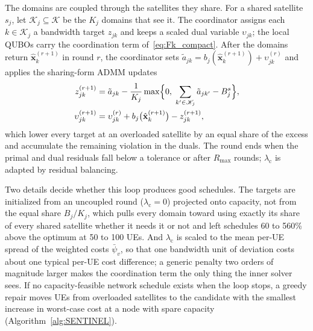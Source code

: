 The domains are coupled through the satellites they share. For a shared satellite $s_j$, let
$\mathscr{K}_j\subseteq\mathscr{K}$ be the $K_j$ domains that see it. The coordinator assigns each
$k\in\mathscr{K}_j$ a bandwidth target $z_{jk}$ and keeps a scaled dual variable $\upsilon_{jk}$; the local QUBOs carry the
coordination term of~\eqref{eq:Fk_compact}. After the domains return $\hat{\mathbf{x}}_k^{(r+1)}$ in round $r$, the
coordinator sets $\tilde{a}_{jk}=b_j(\hat{\mathbf{x}}_{k}^{(r+1)})+\upsilon_{jk}^{(r)}$ and applies the sharing-form ADMM
updates~\cite{Boyd2011}
\begin{align}
    z_{jk}^{(r+1)}&=\tilde{a}_{jk}-\frac{1}{K_j}\max\Bigl\{0,\;\sum_{k'\in\mathscr{K}_j}\tilde{a}_{jk'}-B^{s}_{j}\Bigr\},
    \label{eq:z_update}\\
    \upsilon_{jk}^{(r+1)}&=\upsilon_{jk}^{(r)}+b_j\bigl(\hat{\mathbf{x}}_{k}^{(r+1)}\bigr)-z_{jk}^{(r+1)},
    \label{eq:u_update}
\end{align}
which lower every target at an overloaded satellite by an equal share of the excess and accumulate the remaining
violation in the duals. The round ends when the primal and dual residuals fall below a tolerance or after $R_{\max}$ rounds;
$\lambda_{\mathrm{c}}$ is adapted by residual balancing.

Two details decide whether this loop produces good schedules. The targets are initialized from an uncoupled round
($\lambda_{\mathrm{c}}=0$) projected onto capacity, not from the equal share $B_j/K_j$, which pulls every domain toward
using exactly its share of every shared satellite whether it needs it or not and left schedules 60 to 560\% above the
optimum at 50 to 100 UEs. And $\lambda_{\mathrm{c}}$ is scaled to the mean per-UE spread of the weighted costs
$\bar\psi_v$, so that one bandwidth unit of deviation costs about one typical per-UE cost difference; a generic penalty
two orders of magnitude larger makes the coordination term the only thing the inner solver sees. If no
capacity-feasible network schedule exists when the loop stops, a greedy repair moves UEs from overloaded satellites to
the candidate with the smallest increase in worst-case cost at a node with spare capacity
(Algorithm~\ref{alg:SENTINEL}).


